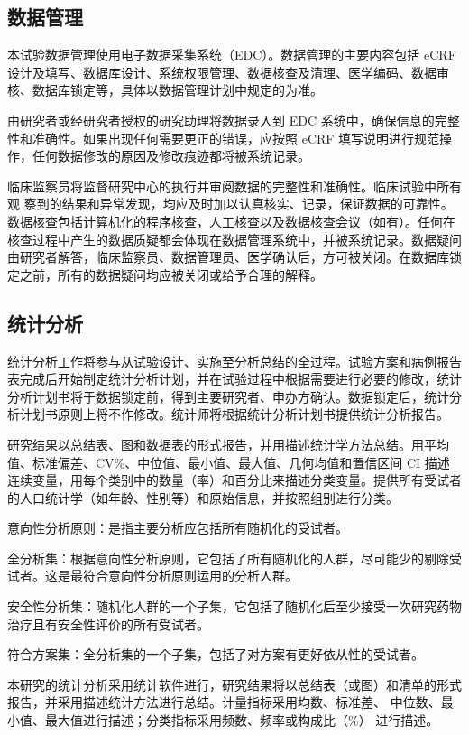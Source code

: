 \documentclass[
  chinese-hans,
  letterpaper,
  DIV=11,
  numbers=noendperiod]{scrreprt}
\begin{document}
\subsection{数据管理}\label{ux6570ux636eux7ba1ux7406}

本试验数据管理使用电子数据采集系统（EDC）。数据管理的主要内容包括 eCRF
设计及填写、数据库设计、系统权限管理、数据核查及清理、医学编码、数据审核、数据库锁定等，具体以数据管理计划中规定的为准。

由研究者或经研究者授权的研究助理将数据录入到 EDC
系统中，确保信息的完整性和准确性。如果出现任何需要更正的错误，应按照
eCRF 填写说明进行规范操作，任何数据修改的原因及修改痕迹都将被系统记录。

临床监察员将监督研究中心的执行并审阅数据的完整性和准确性。临床试验中所有观
察到的结果和异常发现，均应及时加以认真核实、记录，保证数据的可靠性。数据核查包括计算机化的程序核查，人工核查以及数据核查会议（如有）。任何在核查过程中产生的数据质疑都会体现在数据管理系统中，并被系统记录。数据疑问由研究者解答，临床监察员、数据管理员、医学确认后，方可被关闭。在数据库锁定之前，所有的数据疑问均应被关闭或给予合理的解释。

\subsection{统计分析}\label{ux7edfux8ba1ux5206ux6790}

统计分析工作将参与从试验设计、实施至分析总结的全过程。试验方案和病例报告表完成后开始制定统计分析计划，并在试验过程中根据需要进行必要的修改，统计分析计划书将于数据锁定前，得到主要研究者、申办方确认。数据锁定后，统计分析计划书原则上将不作修改。统计师将根据统计分析计划书提供统计分析报告。

研究结果以总结表、图和数据表的形式报告，并用描述统计学方法总结。用平均值、标准偏差、CV\%、中位值、最小值、最大值、几何均值和置信区间
CI
描述连续变量，用每个类别中的数量（率）和百分比来描述分类变量。提供所有受试者的人口统计学（如年龄、性别等）和原始信息，并按照组别进行分类。

意向性分析原则：是指主要分析应包括所有随机化的受试者。

全分析集：根据意向性分析原则，它包括了所有随机化的人群，尽可能少的剔除受试者。这是最符合意向性分析原则运用的分析人群。

安全性分析集：随机化人群的一个子集，它包括了随机化后至少接受一次研究药物治疗且有安全性评价的所有受试者。

符合方案集：全分析集的一个子集，包括了对方案有更好依从性的受试者。

本研究的统计分析采用统计软件进行，研究结果将以总结表（或图）和清单的形式报告，并采用描述统计方法进行总结。计量指标采用均数、标准差、
中位数、最小值、最大值进行描述；分类指标采用频数、频率或构成比（\%）
进行描述。
\end{document}
